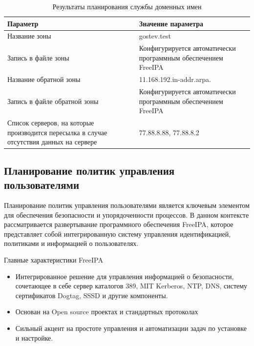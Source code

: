 \documentclass[14pt, a4paper]{extarticle}
\numberwithin{equation}{section}
\begin{document}
\begin{table}[H]
\centering
\small
\label{table:dns_plan}
\caption{Результаты планирования службы доменных имен}
\begin{tabular}{|m{6cm}|m{10cm}|}
\hline
\textbf{Параметр} & \textbf{Значение параметра} \\
\hline
Название зоны &  gostev.test \\
\hline
Запись в файле зоны &  Конфигурируется автоматически программным обеспечением FreeIPA\\
\hline
Название обратной зоны &  11.168.192.in-addr.arpa.\\
\hline
Запись в файле обратной зоны &  Конфигурируется автоматически программным обеспечением FreeIPA\\
\hline
Список серверов, на которые производится пересылка в случае отсутствия данных на сервере &  77.88.8.88, 77.88.8.2\\
\hline
\end{tabular}
\end{table}




\subsection{Планирование политик управления пользователями}
Планирование политик управления пользователями является ключевым элементом для 
обеспечения безопасности и упорядоченности процессов. 
В данном контексте рассматривается развертывание программного обеспечения 
FreeIPA, которое представляет собой интегрированную систему управления идентификацией, 
политиками и информацией о пользователях.

Главные характеристики FreeIPA
\begin{itemize}
        \item Интегрированное решение для управления информацией о безопасности, 
        сочетающее в себе сервер каталогов 389, MIT Kerberos, 
        NTP, DNS, систему сертификатов Dogtag, SSSD и другие компоненты.
        \item Основан на Open source проектах и стандартных протоколах
        \item Сильный акцент на простоте управления и автоматизации задач по установке и настройке.
\end{itemize}
\end{document}
